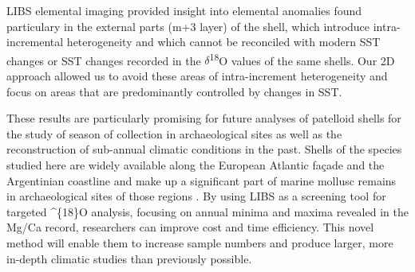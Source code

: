 \documentclass[
  authoryear,
  preprint,
  3p]{elsarticle}
\begin{document}
LIBS elemental imaging provided insight into elemental anomalies found
particulary in the external parts (m+3 layer) of the shell, which
introduce intra-incremental heterogeneity and which cannot be reconciled
with modern SST changes or SST changes recorded in the
\(\delta\)\textsuperscript{18}O values of the same shells. Our 2D
approach allowed us to avoid these areas of intra-increment
heterogeneity and focus on areas that are predominantly controlled by
changes in SST.

These results are particularly promising for future analyses of
patelloid shells for the study of season of collection in archaeological
sites as well as the reconstruction of sub-annual climatic conditions in
the past. Shells of the species studied here are widely available along
the European Atlantic façade and the Argentinian coastline and make up a
significant part of marine mollusc remains in archaeological sites of
those regions
\citep{Colonese2011-ab, Villagran2011-ld, Zangrando2016-yl}. By using
LIBS as a screening tool for targeted \delta\^{}\{18\}O analysis,
focusing on annual minima and maxima revealed in the Mg/Ca record,
researchers can improve cost and time efficiency. This novel method will
enable them to increase sample numbers and produce larger, more in-depth
climatic studies than previously possible.


\renewcommand\refname{References}
  
\end{document}
